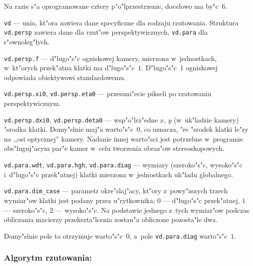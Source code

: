 \begin{mydescription}
    Na razie s"a oprogramowane cztery p"o"lprzestrzenie, docelowo ma
    by"c~$6$.
  \item[]\texttt{vd} --- unia, kt"ora zawiera dane specyficzne dla rodzaju
    rzutowania. Struktura \texttt{vd.persp} zawiera dane dla rzut"ow
    perspektywicznych, \texttt{vd.para} dla r"ownoleg"lych.
  \item[]\texttt{vd.persp.f} --- d"lugo"s"c ogniskowej kamery, mierzona
    w~jednostkach, w~kt"orych przek"atna klatki ma d"lugo"s"c~$1$.
    D"lugo"s"c~$1$ ogniskowej odpowiada obiektywowi standardowemu.
  \item[]\texttt{vd.persp.xi0}, \texttt{vd.persp.eta0} --- przesuni"ecie
    pikseli po rzutowaniu perspektywicznym.
  \item[]\texttt{vd.persp.dxi0}, \texttt{vd.persp.deta0} --- wsp"o"lrz"edne
    $x$, $y$ (w~uk"ladzie kamery) "srodka klatki. Domy"slnie maj"a
    warto"s"c~$0$, co oznacza, "re "srodek klatki le"ry na ,,osi optycznej''
    kamery. Nadanie innej warto"sci jest potrzebne w~programie obs"luguj"acym
    par"e kamer w~celu tworzenia obraz"ow stereoskopowych.
  \item[]\texttt{vd.para.wdt}, \texttt{vd.para.hgh}, \texttt{vd.para.diag}
    --- wymiary (szeroko"s"c, wysoko"s"c i~d"lugo"s"c przek"atnej) klatki
    mierzona w~jednostkach uk"ladu globalnego.
  \item[]\texttt{vd.para.dim\_case} --- parametr okre"slaj"acy, kt"ory
    z~powy"zszych trzech wymiar"ow klatki jest podany przez u"rytkownika;
    $0$ --- d"lugo"s"c przek"atnej, $1$ --- szeroko"s"c, $2$ --- wysoko"s"c.
    Na podstawie jednego z~tych wymiar"ow podczas obliczania macierzy
    przekszta"lcenia zostan"a obliczone pozosta"le dwa.

    Domy"slnie pole to otrzymuje warto"s"c~$0$, a~pole \texttt{vd.para.diag}
    warto"s"c~$1$.
\end{mydescription}

\subsubsection*{Algorytm rzutowania:}

